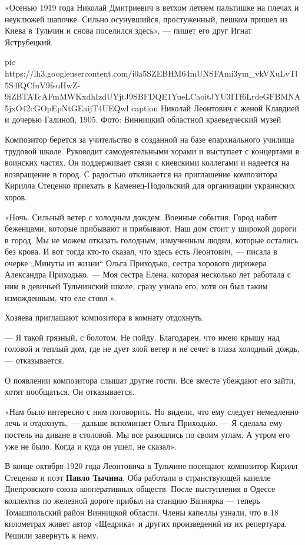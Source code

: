 «Осенью 1919 года Николай Дмитриевич в ветхом летнем пальтишке на плечах и
неуклюжей шапочке. Сильно осунувшийся, простуженный, пешком пришел из Киева в
Тульчин и снова поселился здесь», — пишет его друг Игнат Яструбецкий.

\ifcmt
pic https://lh3.googleusercontent.com/i0a5SZEBHM64mUNSFAmi3ym_vkVXuLvTl5S4fQCfuV9fsuHwZ-9iZBTATcAFmMWKxdhIzdUYjtJ9SBFDQE1YueLCaoitJYU3ITf6LrdeGFBMNA5jxO42cGOpEpNtGEaijT4UEQwl
caption Николай Леонтович с женой Клавдией и дочерью Галиной, 1905. Фото: Винницкий областной краеведческий музей
\fi

Композитор берется за учительство в созданной на базе епархиального училища
трудовой школе. Руководит самодеятельными хорами и выступает с концертами в
воинских частях. Он поддерживает связи с киевскими коллегами и надеется на
возвращение в город. С радостью откликается на приглашение композитора Кирилла
Стеценко приехать в Каменец-Подольский для организации украинских хоров.

«Ночь. Сильный ветер с холодным дождем. Военные события. Город набит беженцами,
которые прибывают и прибывают. Наш дом стоит у широкой дороги в город. Мы не
можем отказать голодным, измученным людям, которые остались без крова. И вот
тогда кто-то сказал, что здесь есть Леонтович, — писала в очерке „Минуты из
жизни“ Ольга Приходько, сестра хорового дирижера Александра Приходько. — Моя
сестра Елена, которая несколько лет работала с ним в девичьей Тульчинский
школе, сразу узнала его, хотя он был таким изможденным, что еле стоял ».

Хозяева приглашают композитора в комнату отдохнуть.

— Я такой грязный, с болотом. Не пойду. Благодарен, что имею крышу над головой
и теплый дом, где не дует злой ветер и не сечет в глаза холодный дождь, —
отказывается.

О появлении композитора слышат другие гости. Все вместе убеждают его зайти,
хотят пообщаться. Он отказывается.

«Нам было интересно с ним поговорить. Но видели, что ему следует немедленно
лечь и отдохнуть, — дальше вспоминает Ольга Приходько. — Я сделала ему постель
на диване в столовой. Мы все разошлись по своим углам. А утром его уже не было.
Когда и куда он ушел, не сказал».

В конце октября 1920 года Леонтовича в Тульчине посещают композитор Кирилл
Стеценко и поэт \textbf{Павло Тычина}. Оба работали в странствующей капелле
Днепровского союза кооперативных обществ. После выступления в Одессе коллектив
по железной дороге прибыл на станцию Вапнярка — теперь Томашпольский район
Винницкой области. Члены капеллы узнали, что в 18 километрах живет автор
«Щедрика» и других произведений из их репертуара. Решили завернуть к нему.

